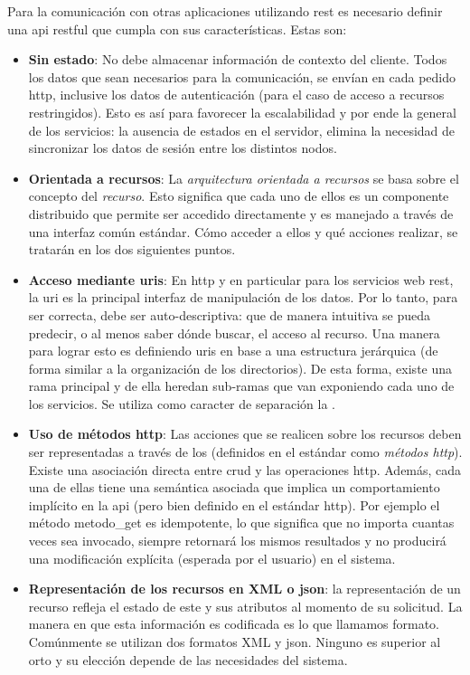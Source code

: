 Para la comunicación con otras aplicaciones utilizando \gls{rest} es necesario definir una \gls{api} \gls{restful} que cumpla con sus características\cite{fielding2000rest}. Estas son:
\begin{itemize}
\item \textbf{Sin estado}: No debe almacenar información de contexto del cliente. Todos los datos que sean necesarios para la comunicación, se envían en cada pedido \gls{http}, inclusive los datos de autenticación (para el caso de acceso a recursos restringidos). Esto es así para favorecer la escalabilidad y por ende la  general de los servicios: la ausencia de estados en el servidor, elimina la necesidad de sincronizar los datos de sesión entre los distintos nodos\cite{rodriguez2008restful}.

\item \textbf{Orientada a recursos}: La \textit{arquitectura orientada a recursos} se basa sobre el concepto del \textit{recurso}. Esto significa que cada uno de ellos es un componente distribuido que permite ser accedido directamente y es manejado a través de una interfaz común estándar\cite{lucchi2008resource}. Cómo acceder a ellos y qué acciones realizar, se tratarán en los dos siguientes puntos.

\item \textbf{Acceso mediante \glspl{uri}}: En \gls{http} y en particular para los servicios web \gls{rest}, la \gls{uri} es la principal interfaz de manipulación de los datos. Por lo tanto, para ser correcta, debe ser auto-descriptiva: que de manera intuitiva se pueda predecir, o al menos saber dónde buscar, el acceso al recurso. Una manera para lograr esto es definiendo \glspl{uri} en base a una estructura jerárquica (de forma similar a la organización de los directorios). De esta forma, existe una rama principal y de ella heredan sub-ramas que van exponiendo cada uno de los servicios. Se utiliza como caracter de separación la .

\item \textbf{Uso de métodos \gls{http}}: Las acciones que se realicen sobre los recursos deben ser representadas a través de los  (definidos en el estándar como \textit{métodos \gls{http}}). Existe una asociación directa entre \gls{crud} y las operaciones \gls{http}\cite{fielding2000rest}. Además, cada una de ellas tiene una semántica asociada que implica un comportamiento implícito en la \gls{api} (pero bien definido en el estándar \gls{http}). Por ejemplo el método \gls{metodo_get} es idempotente, lo que significa que no importa cuantas veces sea invocado, siempre retornará los mismos resultados y no producirá una modificación explícita (esperada por el usuario) en el sistema.
\item \textbf{Representación de los recursos en \gls{XML} o \gls{json}}: la representación de un recurso refleja el estado de este y sus atributos al momento de su solicitud. La manera en que esta información es codificada es lo que llamamos formato. Comúnmente se utilizan dos formatos \gls{XML} y \gls{json}. Ninguno es superior al orto y su elección depende de las necesidades del sistema. 


\end{itemize}
